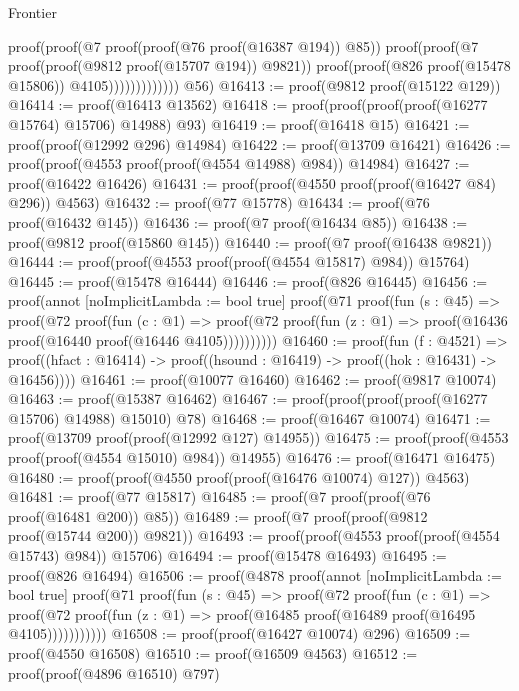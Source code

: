 \begin{lexlean}{Frontier}
\begin{coremodule}
                                proof(proof(@7 proof(proof(@76 proof(@16387 @194)) @85))
                                    proof(proof(@7 proof(proof(@9812 proof(@15707 @194)) @9821))
                                        proof(proof(@826 proof(@15478 @15806)) @4105)))))))))))))
      @56)
@16413 := proof(@9812 proof(@15122 @129))
@16414 := proof(@16413 @13562)
@16418 := proof(proof(proof(proof(@16277 @15764) @15706) @14988) @93)
@16419 := proof(@16418 @15)
@16421 := proof(proof(@12992 @296) @14984)
@16422 := proof(@13709 @16421)
@16426 := proof(proof(@4553 proof(proof(@4554 @14988) @984)) @14984)
@16427 := proof(@16422 @16426)
@16431 := proof(proof(@4550 proof(proof(@16427 @84) @296)) @4563)
@16432 := proof(@77 @15778)
@16434 := proof(@76 proof(@16432 @145))
@16436 := proof(@7 proof(@16434 @85))
@16438 := proof(@9812 proof(@15860 @145))
@16440 := proof(@7 proof(@16438 @9821))
@16444 := proof(proof(@4553 proof(proof(@4554 @15817) @984)) @15764)
@16445 := proof(@15478 @16444)
@16446 := proof(@826 @16445)
@16456 := proof(annot [noImplicitLambda := bool true]
    proof(@71
        proof(fun (s : @45) =>
          proof(@72
              proof(fun (c : @1) =>
                proof(@72
                    proof(fun (z : @1) => proof(@16436 proof(@16440 proof(@16446 @4105))))))))))
@16460 := proof(fun (f : @4521) =>
    proof((hfact : @16414) -> proof((hsound : @16419) -> proof((hok : @16431) -> @16456))))
@16461 := proof(@10077 @16460)
@16462 := proof(@9817 @10074)
@16463 := proof(@15387 @16462)
@16467 := proof(proof(proof(proof(@16277 @15706) @14988) @15010) @78)
@16468 := proof(@16467 @10074)
@16471 := proof(@13709 proof(proof(@12992 @127) @14955))
@16475 := proof(proof(@4553 proof(proof(@4554 @15010) @984)) @14955)
@16476 := proof(@16471 @16475)
@16480 := proof(proof(@4550 proof(proof(@16476 @10074) @127)) @4563)
@16481 := proof(@77 @15817)
@16485 := proof(@7 proof(proof(@76 proof(@16481 @200)) @85))
@16489 := proof(@7 proof(proof(@9812 proof(@15744 @200)) @9821))
@16493 := proof(proof(@4553 proof(proof(@4554 @15743) @984)) @15706)
@16494 := proof(@15478 @16493)
@16495 := proof(@826 @16494)
@16506 := proof(@4878
      proof(annot [noImplicitLambda := bool true]
        proof(@71
            proof(fun (s : @45) =>
              proof(@72
                  proof(fun (c : @1) =>
                    proof(@72
                        proof(fun (z : @1) =>
                          proof(@16485 proof(@16489 proof(@16495 @4105)))))))))))
@16508 := proof(proof(@16427 @10074) @296)
@16509 := proof(@4550 @16508)
@16510 := proof(@16509 @4563)
@16512 := proof(proof(@4896 @16510) @797)

\end{coremodule}
\end{lexlean}
